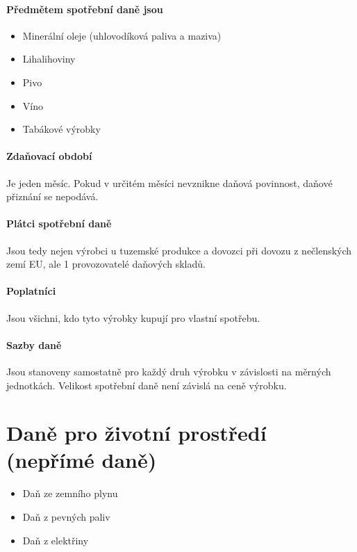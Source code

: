\paragraph{Předmětem spotřební daně jsou}
\begin{itemize}
    \item Minerální oleje (uhlovodíková paliva a maziva)
    \item Lihalihoviny
    \item Pivo
    \item Víno
    \item Tabákové výrobky
\end{itemize}

\paragraph{Zdaňovací období}
Je jeden měsíc. Pokud v určitém měsíci nevznikne daňová povinnost, daňové přiznání se nepodává.

\paragraph{Plátci spotřební daně}
Jsou tedy nejen výrobci u tuzemské produkce a dovozci při dovozu z nečlenských zemí EU, ale 1 provozovatelé daňových skladů.

\paragraph{Poplatníci}
Jsou všichni, kdo tyto výrobky kupují pro vlastní spotřebu.

\paragraph{Sazby daně}
Jsou stanoveny samostatně pro každý druh výrobku v závislosti na měrných jednotkách. Velikost spotřební daně není závislá na ceně výrobku.

\section*{Daně pro životní prostředí (nepřímé daně)}

\begin{itemize}
    \item Daň ze zemního plynu
    \item Daň z pevných paliv
    \item Daň z elektřiny
\end{itemize}

